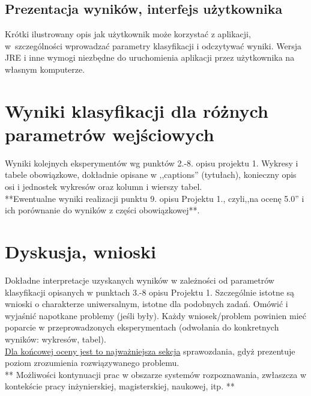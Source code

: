 \documentclass{classrep}
\begin{document}
\subsection{Prezentacja wyników, interfejs użytkownika} 
Krótki ilustrowany opis jak użytkownik może korzystać z aplikacji, w~szczególności wprowadzać parametry klasyfikacji i odczytywać wyniki. Wersja JRE i inne wymogi
niezbędne do uruchomienia aplikacji przez użytkownika na własnym komputerze. \\

\section{Wyniki klasyfikacji dla różnych parametrów wejściowych}
Wyniki kolejnych eksperymentów wg punktów 2.-8. opisu projektu 1.  Wykresy i tabele
obowiązkowe, dokładnie opisane w ,,captions'' (tytułach), konieczny opis osi i
jednostek wykresów oraz kolumn i wierszy tabel.\\ 

{**Ewentualne wyniki realizacji punktu 9. opisu Projektu 1., czyli,,na ocenę 5.0'' i ich porównanie do wyników z
części obowiązkowej**.}\\



\section{Dyskusja, wnioski}
Dokładne interpretacje uzyskanych wyników w zależności od parametrów klasyfikacji
opisanych w punktach 3.-8 opisu Projektu 1. 
Szczególnie istotne są wnioski o charakterze uniwersalnym, istotne dla podobnych zadań. 
Omówić i wyjaśnić napotkane problemy (jeśli były). Każdy wniosek/problem powinien mieć poparcie
w przeprowadzonych eksperymentach (odwołania do konkretnych wyników: wykresów,
tabel). \\
\underline{Dla końcowej oceny jest to najważniejsza sekcja} sprawozdania, gdyż prezentuje poziom
zrozumienia rozwiązywanego problemu.\\

** Możliwości kontynuacji prac w obszarze systemów rozpoznawania, zwłaszcza w kontekście pracy inżynierskiej,
magisterskiej, naukowej, itp. **\\
\end{document}
